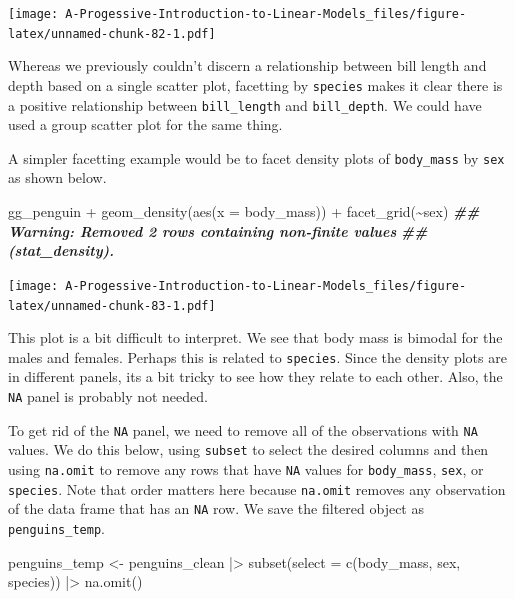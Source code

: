 \documentclass[
]{book}
\newenvironment{Shaded}{\begin{snugshade}}{\end{snugshade}}
\newcommand{\AttributeTok}[1]{\textcolor[rgb]{0.77,0.63,0.00}{#1}}
\newcommand{\DocumentationTok}[1]{\textcolor[rgb]{0.56,0.35,0.01}{\textbf{\textit{#1}}}}
\newcommand{\FunctionTok}[1]{\textcolor[rgb]{0.00,0.00,0.00}{#1}}
\newcommand{\NormalTok}[1]{#1}
\newcommand{\OtherTok}[1]{\textcolor[rgb]{0.56,0.35,0.01}{#1}}
\newcommand{\SpecialCharTok}[1]{\textcolor[rgb]{0.00,0.00,0.00}{#1}}
\theoremstyle{definition}
\theoremstyle{definition}
\theoremstyle{definition}
\theoremstyle{definition}
\theoremstyle{remark}
\begin{document}
\texttt{[image: A-Progessive-Introduction-to-Linear-Models\_files/figure-latex/unnamed-chunk-82-1.pdf]}

Whereas we previously couldn't discern a relationship between bill length and depth based on a single scatter plot, facetting by \texttt{species} makes it clear there is a positive relationship between \texttt{bill\_length} and \texttt{bill\_depth}. We could have used a group scatter plot for the same thing.

A simpler facetting example would be to facet density plots of \texttt{body\_mass} by \texttt{sex} as shown below.

\begin{Shaded}
\begin{Highlighting}[]
\NormalTok{gg\_penguin }\SpecialCharTok{+} \FunctionTok{geom\_density}\NormalTok{(}\FunctionTok{aes}\NormalTok{(}\AttributeTok{x =}\NormalTok{ body\_mass)) }\SpecialCharTok{+} \FunctionTok{facet\_grid}\NormalTok{(}\SpecialCharTok{\textasciitilde{}}\NormalTok{sex)}
\DocumentationTok{\#\# Warning: Removed 2 rows containing non{-}finite values}
\DocumentationTok{\#\# (stat\_density).}
\end{Highlighting}
\end{Shaded}

\texttt{[image: A-Progessive-Introduction-to-Linear-Models\_files/figure-latex/unnamed-chunk-83-1.pdf]}

This plot is a bit difficult to interpret. We see that body mass is bimodal for the males and females. Perhaps this is related to \texttt{species}. Since the density plots are in different panels, its a bit tricky to see how they relate to each other. Also, the \texttt{NA} panel is probably not needed.

To get rid of the \texttt{NA} panel, we need to remove all of the observations with \texttt{NA} values. We do this below, using \texttt{subset} to select the desired columns and then using \texttt{na.omit} to remove any rows that have \texttt{NA} values for \texttt{body\_mass}, \texttt{sex}, or \texttt{species}. Note that order matters here because \texttt{na.omit} removes any observation of the data frame that has an \texttt{NA} row. We save the filtered object as \texttt{penguins\_temp}.

\begin{Shaded}
\begin{Highlighting}[]
\NormalTok{penguins\_temp }\OtherTok{\textless{}{-}}
\NormalTok{  penguins\_clean }\SpecialCharTok{|\textgreater{}}
  \FunctionTok{subset}\NormalTok{(}\AttributeTok{select =} \FunctionTok{c}\NormalTok{(body\_mass, sex, species)) }\SpecialCharTok{|\textgreater{}}
  \FunctionTok{na.omit}\NormalTok{()}
\end{Highlighting}
\end{Shaded}
\end{document}
